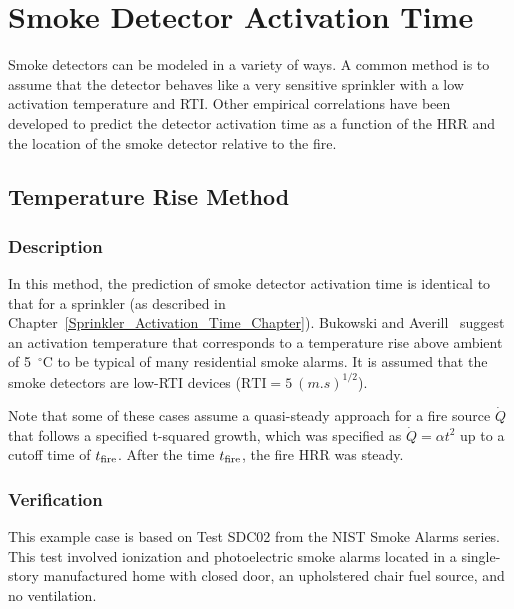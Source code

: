 
\chapter{Smoke Detector Activation Time}
\label{Smoke_Detector_Activation_Time_Chapter}

Smoke detectors can be modeled in a variety of ways. A common method is to assume that the detector behaves like a very sensitive sprinkler with a low activation temperature and RTI. Other empirical correlations have been developed to predict the detector activation time as a function of the HRR and the location of the smoke detector relative to the fire.

\section{Temperature Rise Method}

\subsection*{Description}

In this method, the prediction of smoke detector activation time is identical to that for a sprinkler (as described in Chapter~\ref{Sprinkler_Activation_Time_Chapter}). Bukowski and Averill~\cite{Bukowski:2} suggest an activation temperature that corresponds to a temperature rise above ambient of 5~$^\circ$C to be typical of many residential smoke alarms. It is assumed that the smoke detectors are low-RTI devices ($\textrm{RTI}=5~\si{(m.s)^{1/2}}$).

Note that some of these cases assume a quasi-steady approach for a fire source $\dot Q$ that follows a specified t-squared growth, which was specified as $\dot Q = \alpha t^2$ up to a cutoff time of $t\sb{fire}$. After the time $t\sb{fire}$, the fire HRR was steady.


\clearpage


\subsection*{Verification}

This example case is based on Test SDC02 from the NIST Smoke Alarms series. This test involved ionization and photoelectric smoke alarms located in a single-story manufactured home with closed door, an upholstered chair fuel source, and no ventilation.

